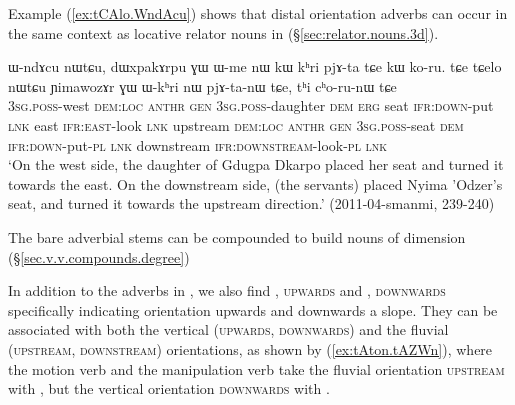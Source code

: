  Example (\ref{ex:tCAlo.WndAcu}) shows that distal orientation adverbs can occur in the same context as locative relator nouns in  (§\ref{sec:relator.nouns.3d}).

 \begin{exe}
\ex \label{ex:tCAlo.WndAcu}
\gll ɯ-ndɤcu nɯtɕu, dɯxpakɤrpu ɣɯ ɯ-me nɯ kɯ kʰri pjɤ-ta tɕe kɯ ko-ru.
tɕe tɕelo nɯtɕu ɲimawozɤr ɣɯ ɯ-kʰri nɯ pjɤ-ta-nɯ tɕe, tʰi cʰo-ru-nɯ tɕe \\
\textsc{3sg}.\textsc{poss}-west \textsc{dem}:\textsc{loc}  \textsc{anthr} \textsc{gen} \textsc{3sg}.\textsc{poss}-daughter \textsc{dem} \textsc{erg} seat \textsc{ifr}:\textsc{down}-put \textsc{lnk} east \textsc{ifr}:\textsc{east}-look  \textsc{lnk} upstream \textsc{dem}:\textsc{loc}  \textsc{anthr} \textsc{gen} \textsc{3sg}.\textsc{poss}-seat \textsc{dem} \textsc{ifr}:\textsc{down}-put-\textsc{pl} \textsc{lnk} downstream \textsc{ifr}:\textsc{downstream}-look-\textsc{pl} \textsc{lnk} \\ 
\glt `On the west side, the daughter of Gdugpa Dkarpo placed her seat and turned it towards the east. On the downstream side, (the servants) placed Nyima 'Odzer's seat, and turned it towards the upstream direction.' (2011-04-smanmi, 239-240)
 \end{exe}

The bare adverbial stems can be compounded to build nouns of dimension (§\ref{sec.v.v.compounds.degree})

In addition to the adverbs in , we also find , \textsc{upwards} and , \textsc{downwards} specifically indicating orientation upwards and downwards a slope. They can be associated with both the vertical (\textsc{upwards}, \textsc{downwards}) and the fluvial (\textsc{upstream}, \textsc{downstream}) orientations, as shown by (\ref{ex:tAton.tAZWn}), where the motion verb  and the manipulation verb  take the fluvial orientation \textsc{upstream} with , but the vertical orientation \textsc{downwards} with .

